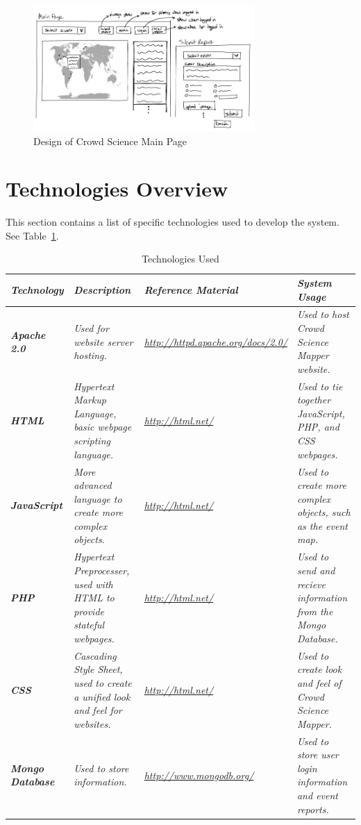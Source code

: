 \begin{figure}[tbh]
\begin{center}
\includegraphics[width=0.75\textwidth]{./Images/crowdscience_mainpagesketch.png}
\end{center}
\caption{Design of Crowd Science Main Page\label{mainpage}}
\end{figure}

\section{Technologies Overview}
This section contains a list of specific technologies used to develop the system.  See Table~\ref{technologies}.  

\begin{table}[tbh]
\caption{Technologies Used \label{technologies}}
\begin{center}
\begin{tabular}{|>{\raggedright}p{2cm}|>{\raggedright}p{4cm}|>{\raggedright}p{4cm}|>{\raggedright}p{4cm}|}

  \hline
\textit{\textbf{Technology}} &  \textit{\textbf{Description}} & \textit{\textbf{Reference Material}} & \textit{\textbf{System Usage}}\tabularnewline
\hline
 \textit{\textbf{Apache 2.0}} & \textit{Used for website server hosting.} & \textit{\url{http://httpd.apache.org/docs/2.0/}} & \textit{Used to host Crowd Science Mapper website.}\tabularnewline
\hline
 \textit{\textbf{HTML}} & \textit{Hypertext Markup Language, basic webpage scripting language.} & \textit{\url{http://html.net/}} & \textit{Used to tie together JavaScript, PHP, and CSS webpages.}\tabularnewline
 \hline
  \textit{\textbf{JavaScript}} & \textit{More advanced language to create more complex objects.} & \textit{\url{http://html.net/}} & \textit{Used to create more complex objects, such as the event map.}\tabularnewline
 \hline
  \textit{\textbf{PHP}} & \textit{Hypertext Preprocesser, used with HTML to provide stateful webpages.} & \textit{\url{http://html.net/}} & \textit{Used to send and recieve information from the Mongo Database.}\tabularnewline
 \hline
  \textit{\textbf{CSS}} & \textit{Cascading Style Sheet, used to create a unified look and feel for websites.} & \textit{\url{http://html.net/}} & \textit{Used to create look and feel of Crowd Science Mapper.}\tabularnewline
 \hline
  \textit{\textbf{Mongo Database}} & \textit{Used to store information.} & \textit{\url{http://www.mongodb.org/}} & \textit{Used to store user login information and event reports.}\tabularnewline
\hline
\end{tabular}
\end{center}
\end{table}

